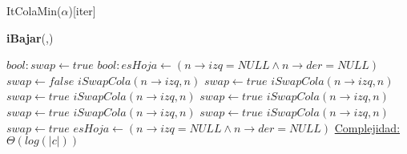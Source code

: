 \begin{Estructura}{ItColaMin($\alpha$)}[iter]
\begin{algorithm}[H]{\textbf{iBajar}(,)}
    	\begin{algorithmic}[1]
			\State $bool: swap \gets true$
			\State $bool: esHoja \gets (n \rightarrow izq = NULL \wedge n \rightarrow der = NULL)$
			 
				\State $swap \gets false$ 
				 
					 				
						\State $iSwapCola(n \rightarrow izq, n) $ 
						\State $swap \gets true$ 
					\EndIf					
				\Else
					 
						 				
							\State $iSwapCola(n \rightarrow izq, n) $ 
							\State $swap \gets true$ 
						\EndIf					
					\Else
						 	 
							 	
								\State $iSwapCola(n \rightarrow izq, n) $ 
								\State $swap \gets true$ 											
							\Else
								 				
									\State $iSwapCola(n \rightarrow izq, n) $ 
									\State $swap \gets true$ 
								\EndIf										
							\EndIf
						\Else
							 		
								\State $iSwapCola(n \rightarrow izq, n) $ 
								\State $swap \gets true$ 
							\Else
								 	
									\State $iSwapCola(n \rightarrow izq, n) $ 
									\State $swap \gets true$ 																		\EndIf							
							\EndIf										
						\EndIf
					\EndIf
				\EndIf
				\State $esHoja \gets (n \rightarrow izq = NULL \wedge n \rightarrow der = NULL)$ 
			\EndWhile
			\medskip
			\Statex \underline{Complejidad:} $\Theta(log(|c|))$
    	\end{algorithmic}
\end{algorithm}


\end{Estructura}

